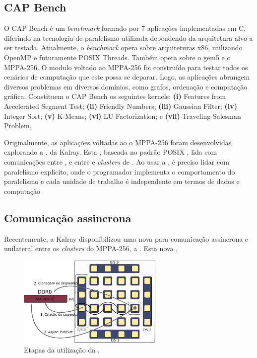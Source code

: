 \documentclass[a4paper,11pt]{article}
\newcommand{\mppa}{MPPA-256\xspace}
\newcommand{\capb}{CAP Bench\xspace}
\begin{document}
\subsection{\capb}
\label{subsec:capb}

O \capb é um \textit{benchmark} formado por 7 aplicações implementadas em C, diferindo na tecnologia de paralelismo utilizada dependendo da arquitetura alvo a ser testada. Atualmente, o \textit{benchmark} opera sobre arquiteturas x86, utilizando OpenMP e futuramente POSIX Threads. Também opera sobre o gem5 e o \mppa. O modulo voltado ao \mppa foi construído para testar todos os cenários de computação que este possa se deparar. Logo, as aplicações abrangem diversos problemas em diversos domínios, como grafos, ordenação e computação gráfica. Constituem o \capb os seguintes kernels: \textbf{(i)} Features from Accelerated Segment Test; \textbf{(ii)} Friendly Numbers; \textbf{(iii)} Gaussian Filter; \textbf{(iv)} Integer Sort; \textbf{(v)} K-Means; \textbf{(vi)} LU Factorization; e \textbf{(vii)} Traveling-Salesman Problem.

Originalmente, as aplicações voltadas ao o \mppa foram desenvolvidas explorando a \api \ipc, da Kalray. Esta \api, baseada no padrão POSIX \ipc, lida com comunicações entre \ccs, e entre \ccs e \textit{clusters} de \es. Ao usar a \ipc, é preciso lidar com paralelismo explicito, onde o programador implementa o comportamento do paralelismo e cada unidade de trabalho é independente em termos de dados e computação \cite{Castro-Souza-CCPE:2016}


\subsection{Comunicação assincrona}
\label{subsec:async}

Recentemente, a Kalray disponibilizou uma nova \api para comunicação assincrona e unilateral entre os \textit{clusters} do \mppa, a \async. Esta nova \api,

\begin{figure}[h]
\centering
\includegraphics[width=7cm, keepaspectratio]{figs/putget.pdf}
\caption{Etapas da utilização da \api \async.}\par
\label{fig:asyncOverview}
\end{figure}
\end{document}
